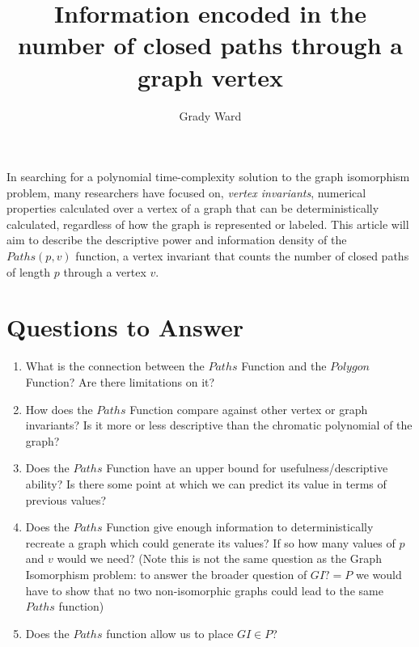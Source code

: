 \documentclass[a4paper,12pt]{article}
\begin{document}
\lstset{language=Python}

\title{Information encoded in the number of closed paths through a graph vertex}
\author{Grady Ward}

\maketitle



In searching for a polynomial time-complexity solution to the graph isomorphism problem, many researchers have focused on, \emph{vertex invariants}, numerical properties calculated over a vertex of a graph that can be deterministically calculated, regardless of how the graph is represented or labeled. This article will aim to describe the descriptive power and information density of the \(Paths(p, v)\) function, a vertex invariant that counts the number of closed paths of length \(p\) through a vertex \(v\).



\section*{Questions to Answer}

\begin{enumerate}
    \item{What is the connection between the \(Paths\) Function and the \(Polygon\) Function?  Are there limitations on it?}
    \item{How does the \(Paths\) Function compare against other vertex or graph invariants?  Is it more or less descriptive than the chromatic polynomial of the graph?}
    \item{Does the \(Paths\) Function have an upper bound for usefulness/descriptive ability? Is there some point at which we can predict its value in terms of previous values?}
    \item{Does the \(Paths\) Function give enough information to deterministically recreate a graph which could generate its values? If so how many values of \(p\) and \(v\) would we need? (Note this is not the same question as the Graph Isomorphism problem: to answer the broader question of \(GI ?= P\) we would have to show that no two non-isomorphic graphs could lead to the same \(Paths\) function)}
    \item{Does the \(Paths\) function allow us to place \(GI \in P\)?}
\end{enumerate}
\end{document}
